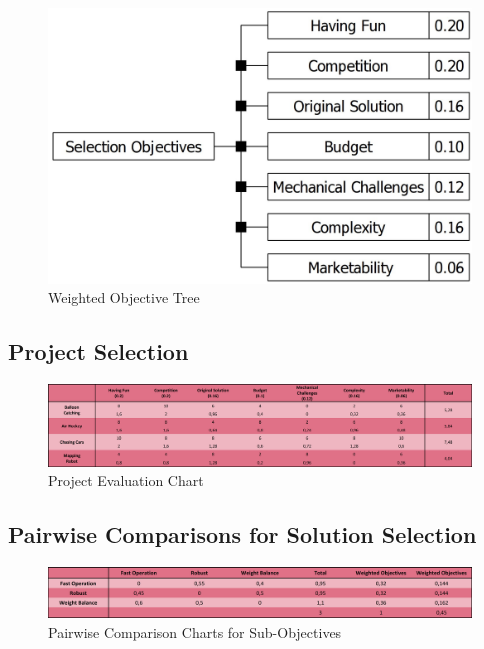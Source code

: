 \documentclass[a4paper,12pt]{article}
\begin{document}
	\begin{figure}[H]
		\centering
		\includegraphics[width=\textwidth,height=\textheight,keepaspectratio]{pre-objective-tree/pre-objective-tree} 
		\caption{\label{fig:objective_tree}Weighted Objective Tree}
	\end{figure}
	
	
	\subsection{Project Selection}	
	
	\begin{figure}[H]
		\centering
		\includegraphics[width=\textwidth,height=\textheight,keepaspectratio]{images/project_evaluation2} 
		\caption{\label{fig:project_eval}Project Evaluation Chart}
	\end{figure}
	
	
	\subsection{Pairwise Comparisons for Solution Selection}	
	
	
	
	\begin{figure}[H]
		\centering
		\includegraphics[width=\textwidth,height=\textheight,keepaspectratio]{images/proje_objective_tree_2} 
		\caption{\label{fig:sub_project_objective_tree}Pairwise Comparison Charts for Sub-Objectives}
	\end{figure}
	
\end{document}
